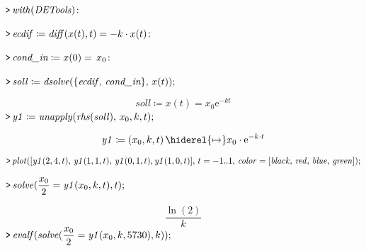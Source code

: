 \documentclass{article}
\begin{document}
\lstset{basicstyle=\ttfamily,breaklines=true,columns=flexible}
\pagestyle{empty}
\mapleinput
{$ \displaystyle \texttt{>\,} \mathit{with} (\mathit{DETools})\colon  $}

\mapleinput
{$ \displaystyle \texttt{>\,} \mathit{ecdif} \coloneqq \mathit{diff} (x (t),t)=-k \cdot x (t)\colon  $}

\mapleinput
{$ \displaystyle \texttt{>\,} \textit{cond\_in} \coloneqq x (0)=\,x_{0}\colon  $}

\mapleinput
{$ \displaystyle \texttt{>\,} \mathit{soll} \coloneqq \mathit{dsolve} (\{\mathit{ecdif} ,\,\textit{cond\_in} \},\,x (t)); $}

\begin{dmath}\label{(1)}
\mathit{soll} \coloneqq x \! \left(t \right)=x_{0} {\mathrm e}^{-k t}
\end{dmath}
\mapleinput
{$ \displaystyle \texttt{>\,} \mathit{y1} \coloneqq \mathit{unapply} (\mathit{rhs} (\mathit{soll}),\,x_{0},k ,t); $}

\begin{dmath}\label{(2)}
\mathit{y1} \coloneqq \left(x_{0},k ,t \right)\hiderel{\mapsto }x_{0}\cdot {\mathrm e}^{-k \cdot t}
\end{dmath}
\mapleinput
{$ \displaystyle \texttt{>\,} \mathit{plot} ([\mathit{y1} (2,4,t),\,\mathit{y1} (1,1,t),\,\mathit{y1} (0,1,t),\mathit{y1} (1,0,t)],\,t =-1..1,\,\mathit{color} =[\mathit{black} ,\,\mathit{red} ,\,\mathit{blue} ,\,\mathit{green}]); $}

{}
\mapleinput
{$ \displaystyle \texttt{>\,} \mathit{solve} (\frac{x_{0}}{2}=\mathit{y1} (x_{0},k ,t),t); $}

\begin{dmath}\label{(3)}
\frac{\ln \! \left(2\right)}{k}
\end{dmath}
\mapleinput
{$ \displaystyle \texttt{>\,} \mathit{evalf} (\mathit{solve} (\frac{x_{0}}{2}=\mathit{y1} (x_{0},k ,5730),k)); $}
\end{document}
